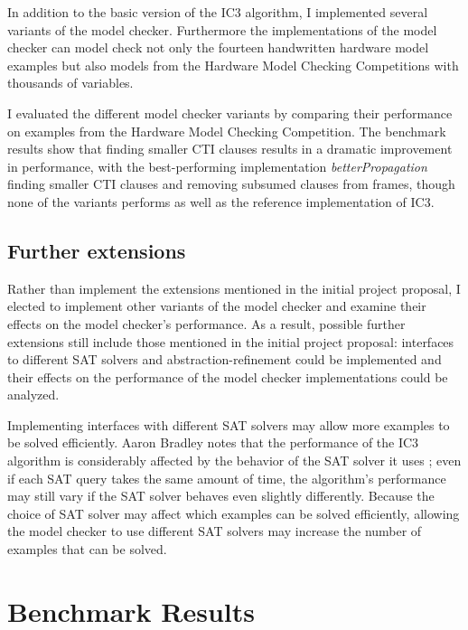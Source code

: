 \documentclass[12pt,a4paper,twoside,openright]{report}
\begin{document}
{In addition to the basic version of the IC3 algorithm, I implemented several variants of the model checker.
Furthermore the implementations of the model checker can model check not only
the fourteen handwritten hardware model examples but also models from the
Hardware Model Checking Competitions with thousands of variables.

I evaluated the different model checker variants by comparing their performance on examples from
the Hardware Model Checking Competition. The benchmark results show that finding smaller CTI clauses
results in a dramatic improvement in performance, with the best-performing implementation
\emph{betterPropagation} finding smaller CTI clauses and removing subsumed clauses from frames,
though none of the variants performs as well as the reference implementation of IC3.

\section{Further extensions}
Rather than implement the extensions mentioned in the initial project proposal, I elected to implement
other variants of the model checker and examine their effects on the model checker's performance.
As a result, possible further extensions still include those mentioned in the initial project
proposal: interfaces to different SAT solvers and abstraction-refinement could be implemented and
their effects on the performance of the model checker implementations could be analyzed.

Implementing interfaces with different SAT solvers may allow more examples to be solved efficiently.
Aaron Bradley notes that the performance of the IC3 algorithm is considerably affected
by the behavior of the SAT solver it uses \cite{bradley12}; even if each SAT query takes the same amount of
time, the algorithm's performance may still vary if the SAT solver behaves even slightly differently.
Because the choice of SAT solver may affect which examples can be solved efficiently, allowing the model
checker to use different SAT solvers may increase the number of examples that can be solved.



\appendix

\chapter{Benchmark Results}
\label{benchmarks}

}
\end{document}
